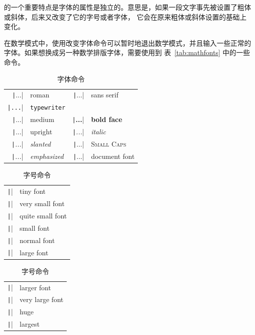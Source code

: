 \documentclass[UTF8]{ctexart}
\begin{document}
\LaTeXe 的一个重要特点是字体的属性是独立的。意思是，如果一段文字事先被设置了粗体或斜体，后来又改变了它的字号或者字体，
它会在原来粗体或斜体设置的基础上变化。

在数学模式中，使用改变字体命令可以暂时地退出数学模式，并且输入一些正常的字体。如果想换成另一种数学排版字体，需要使用到
表~\ref{tab:mathfonts} 中的一些命令。

\begin{table}[!bp]
\centering
\caption{字体命令} \label{tab:fonts}
%
%
\begin{tabular}{@{}rl@{\qquad}rl@{}}
\texttt|\textrm{...}|        &      \textrm{roman}&
\texttt|\textsf{...}|        &      \textsf{sans serif}\\
\texttt|\texttt{...}|        &      \texttt{typewriter}\\[6pt]
\texttt|\textmd{...}|        &      \textmd{medium}&
\texttt|\textbf{...}|        &      \textbf{bold face}\\[6pt]
\texttt|\textup{...}|        &       \textup{upright}&
\texttt|\textit{...}|        &       \textit{italic}\\
\texttt|\textsl{...}|        &       \textsl{slanted}&
\texttt|\textsc{...}|        &       \textsc{Small Caps}\\[6pt]
\texttt|\emph{...}|          &            \emph{emphasized} &
\texttt|\textnormal{...}|    &    \textnormal{document} font
\end{tabular}
\end{table}

\begin{table}[!bp]
\centering
\caption{字号命令} \label{tab:sizes}
\begin{tabular}{@{}ll}
\texttt|\tiny|      & \tiny        tiny font \\
\texttt|\scriptsize|   & \scriptsize  very small font\\
\texttt|\footnotesize| & \footnotesize  quite small font \\
\texttt|\small|        &  \small            small font \\
\texttt|\normalsize|   &  \normalsize  normal font \\
\texttt|\large|        &  \large       large font
\end{tabular}%
\qquad\begin{tabular}{ll@{}}
\texttt|\Large|        &  \Large       larger font \\[5pt]
\texttt|\LARGE|        &  \LARGE       very large font \\[5pt]
\texttt|\huge|         &  \huge        huge \\[5pt]
\texttt|\Huge|         &  \Huge        largest
\end{tabular}
\end{table}
\end{document}
